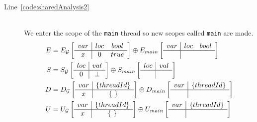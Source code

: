\begin{description}
	\item[Line~\ref{code:sharedAnalysis2}] \hfill \\
		We enter the scope of the \verb$main$ thread so new scopes called \verb$main$
		are made.
		\begin{align*}
			E &= E_{\mathcal{G}} \left[
				\begin{array}{c | c c}
					var	& loc	& bool	\\ \hline
					x	& 0		& true
				\end{array}
			\right]
			\oplus{} 
			E_{main} \left[
				\begin{array}{c | c c}
					var	& loc	& bool	\\ \hline
						& 		& 
				\end{array}
			\right] \\	
			S& =S_{\mathcal{G}} \left[
				\begin{array}{c | c c}
					loc	& val	\\ \hline
					0	& \bot
				\end{array}
			\right]
			\oplus{}
			S_{main} \left[
				\begin{array}{c | c c}
					loc	& val	\\ \hline
						& 
				\end{array}
			\right] \\
			D &= D_{\mathcal{G}} \left[
				\begin{array}{c | c}
					var	& \lbrace threadId \rbrace	\\ \hline
					x	& \lbrace ~\rbrace
				\end{array}
			\right]
			\oplus
			D_{main} \left[
				\begin{array}{c | c c}
					var	& \lbrace threadId \rbrace	\\ \hline
						& 
				\end{array}
			\right] \\
			U &= U_{\mathcal{G}} \left[
				\begin{array}{c | c}
					var	& \lbrace threadId \rbrace	\\ \hline
					x	& \lbrace ~ \rbrace
				\end{array}
			\right]	
			\oplus
			U_{main} \left[
				\begin{array}{c | c c}
					var	& \lbrace threadId \rbrace	\\ \hline
						& 
				\end{array}
			\right]
		\end{align*}
		

\end{description}
